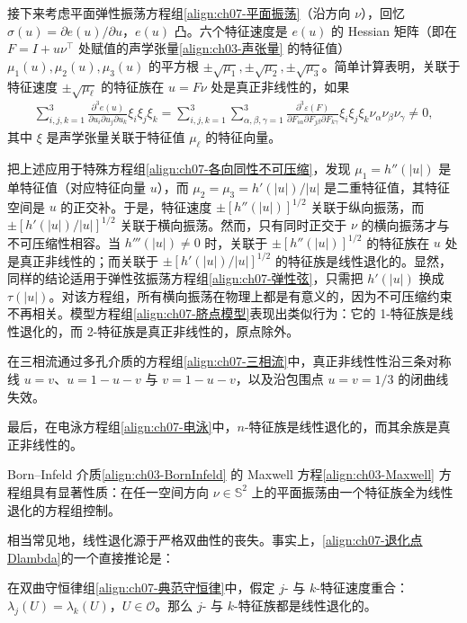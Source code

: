 \documentclass[../../main.tex]{subfiles}
\begin{document}
接下来考虑平面弹性振荡方程组\eqref{align:ch07-平面振荡}（沿方向 $\nu$），回忆 $\sigma(u)=\partial e(u)/\partial u$，$e(u)$ 凸。六个特征速度是 $e(u)$ 的 Hessian 矩阵（即在 $F=I+u\nu^\top$ 处赋值的声学张量\eqref{align:ch03-声张量}
的特征值）$\mu_1(u),\mu_2(u),\mu_3(u)$ 的平方根 $\pm\sqrt{\mu_1},\pm\sqrt{\mu_2},\pm\sqrt{\mu_3}$。简单计算表明，关联于特征速度 $\pm\sqrt{\mu_\ell}$ 的特征族在 $u=F\nu$ 处是真正非线性的，如果
\begin{align}
\sum_{i,j,k=1}^3\frac{\partial^3 e(u)}{\partial u_i\partial u_j\partial u_k}\xi_i\xi_j\xi_k
=\sum_{i,j,k=1}^3\sum_{\alpha,\beta,\gamma=1}^3\frac{\partial^3\varepsilon(F)}{\partial F_{i\alpha}\partial F_{j\beta}\partial F_{k\gamma}}\xi_i\xi_j\xi_k\nu_\alpha\nu_\beta\nu_\gamma\neq 0,
\label{align:ch07-弹性三阶导}
\end{align}
其中 $\xi$ 是声学张量关联于特征值 $\mu_\ell$ 的特征向量。

把上述应用于特殊方程组\eqref{align:ch07-各向同性不可压缩}，发现 $\mu_1=h''(|u|)$ 是单特征值（对应特征向量 $u$），而 $\mu_2=\mu_3=h'(|u|)/|u|$ 是二重特征值，其特征空间是 $u$ 的正交补。于是，特征速度 $\pm[h''(|u|)]^{1/2}$ 关联于纵向振荡，而 $\pm[h'(|u|)/|u|]^{1/2}$ 关联于横向振荡。然而，只有同时正交于 $\nu$ 的横向振荡才与不可压缩性相容。当 $h'''(|u|)\neq 0$ 时，关联于 $\pm[h''(|u|)]^{1/2}$ 的特征族在 $u$ 处是真正非线性的；而关联于 $\pm[h'(|u|)/|u|]^{1/2}$ 的特征族是线性退化的。显然，同样的结论适用于弹性弦振荡方程组\eqref{align:ch07-弹性弦}，只需把 $h'(|u|)$ 换成 $\tau(|u|)$。对该方程组，所有横向振荡在物理上都是有意义的，因为不可压缩约束不再相关。模型方程组\eqref{align:ch07-脐点模型}表现出类似行为：它的 1-特征族是线性退化的，而 2-特征族是真正非线性的，原点除外。

在三相流通过多孔介质的方程组\eqref{align:ch07-三相流}中，真正非线性性沿三条对称线 $u=v$、$u=1-u-v$ 与 $v=1-u-v$，以及沿包围点 $u=v=1/3$ 的闭曲线失效。

最后，在电泳方程组\eqref{align:ch07-电泳}中，$n$-特征族是线性退化的，而其余族是真正非线性的。

Born--Infeld 介质\eqref{align:ch03-BornInfeld}
的 Maxwell 方程\eqref{align:ch03-Maxwell}
方程组具有显著性质：在任一空间方向 $\nu\in\mathbb{S}^2$ 上的平面振荡由一个特征族全为线性退化的方程组控制。

相当常见地，线性退化源于严格双曲性的丧失。事实上，\eqref{align:ch07-退化点Dlambda}的一个直接推论是：

\begin{theorem}\label{theorem:ch07-多重特征线性退化}
在双曲守恒律组\eqref{align:ch07-典范守恒律}中，假定 $j$- 与 $k$-特征速度重合：$\lambda_j(U)=\lambda_k(U)$，$U\in\mathscr{O}$。那么 $j$- 与 $k$-特征族都是线性退化的。
\end{theorem}
\end{document}
